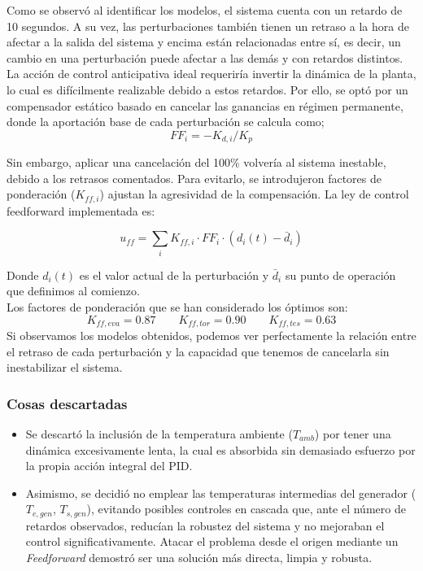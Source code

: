 	
	Como se observó al identificar los modelos, el sistema cuenta con un retardo de 10 segundos. A su vez, las perturbaciones también tienen un retraso a la hora de afectar a la salida del sistema y encima están relacionadas entre sí, es decir, un cambio en una perturbación puede afectar a las demás y con retardos distintos.\\ 
	
	La acción de control anticipativa ideal requeriría invertir la dinámica de la planta, lo cual es difícilmente realizable debido a estos retardos. Por ello, se optó por un compensador estático basado en cancelar las ganancias en régimen permanente, donde la aportación base de cada perturbación se calcula como; $$FF_i = -K_{d,i} / K_p$$
	
	Sin embargo, aplicar una cancelación del 100\% volvería al sistema inestable, debido a los retrasos comentados. Para evitarlo, se introdujeron factores de ponderación ($K_{ff,i}$) ajustan la agresividad de la compensación. La ley de control feedforward implementada es:
	
	\begin{equation}
		u_{ff} = \sum_{i} K_{ff,i} \cdot FF_i \cdot \left( d_i(t) - \bar{d}_i \right)
	\end{equation}
	
	Donde $d_i(t)$ es el valor actual de la perturbación y $\bar{d}_i$ su punto de operación que definimos al comienzo.\\
	
	  Los factores de ponderación que se han considerado los óptimos son: 
	   \begin{equation*}
	   	K_{ff,eva} = 0.87 \qquad K_{ff,tor} = 0.90 \qquad K_{ff,tes} = 0.63
	   \end{equation*}
	Si observamos los modelos obtenidos, podemos ver perfectamente la relación entre el retraso de cada perturbación y la capacidad que tenemos de cancelarla sin inestabilizar el sistema. \\
	
	\subsubsection{Cosas descartadas}
 \begin{itemize}
	 \item Se descartó la inclusión de la temperatura ambiente ($T_{amb}$) por tener una dinámica excesivamente lenta, la cual es absorbida sin demasiado esfuerzo por la propia acción integral del PID.
	 \item Asimismo, se decidió no emplear las temperaturas intermedias del generador ($T_{e,gen}$, $T_{s,gen}$), evitando posibles controles en cascada que, ante el número de retardos observados, reducían la robustez del sistema y no mejoraban el control significativamente. Atacar el problema desde el origen mediante un \textit{Feedforward} demostró ser una solución más directa, limpia y robusta.
	 \end {itemize}
